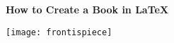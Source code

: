 
{%
	\Large \raggedright \textbf{How to Create a Book in \LaTeX}
	}
\clearpage


\null\vfill
\begin{center}
	\texttt{[image: frontispiece]}
\end{center}
\vfill 
\cleardoublepage